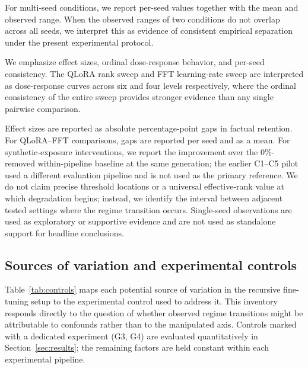 \documentclass[a4paper,fleqn]{cas-dc}
\newif\ifshowchanges
\newcommand{\rev}[1]{\ifshowchanges{\color{blue}#1}\else{#1}\fi}
\begin{document}
For multi-seed conditions, we report per-seed values together with the mean and
observed range. When the observed ranges of two conditions do not overlap across
all seeds, we interpret this as evidence of consistent empirical separation
under the present experimental protocol.

We emphasize
effect sizes, ordinal dose-response behavior, and per-seed consistency. The
QLoRA rank sweep and FFT learning-rate sweep are interpreted as dose-response
curves across six and four levels respectively, where the ordinal consistency of
the entire sweep provides stronger evidence than any single pairwise comparison.

Effect sizes are reported as absolute percentage-point gaps in factual retention.
For QLoRA--FFT comparisons, gaps are reported per seed and as a mean. For
synthetic-exposure interventions, we report the improvement over the \rev{0\%-removed
within-pipeline baseline} at the same generation; \rev{the earlier C1--C5 pilot used a
different evaluation pipeline and is not used as the primary reference.} We do not claim precise threshold locations
or a universal effective-rank value at which degradation begins; instead, we
identify the interval between adjacent tested settings where the regime
transition occurs. Single-seed observations are used as exploratory or
supportive evidence and are not used as standalone support for headline
conclusions.

\subsection{Sources of variation and experimental controls}\label{sec:controls}

Table~\ref{tab:controls} maps each potential source of variation in the
recursive fine-tuning setup to the experimental control used to address it.
This inventory responds directly to the question of whether observed regime
transitions might be attributable to confounds rather than to the manipulated
axis. Controls marked with a dedicated experiment (G3, G4) are evaluated
quantitatively in Section~\ref{sec:results}; the remaining factors are held
constant within each experimental pipeline.
\end{document}
